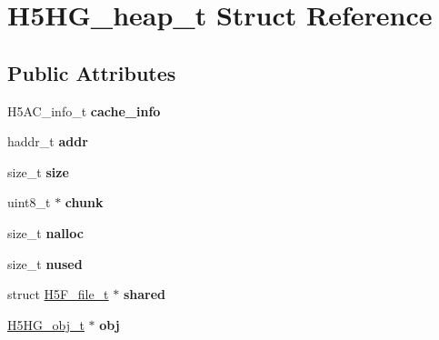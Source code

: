 \hypertarget{struct_h5_h_g__heap__t}{}\section{H5\+H\+G\+\_\+heap\+\_\+t Struct Reference}
\label{struct_h5_h_g__heap__t}
\subsection*{Public Attributes}
\begin{DoxyCompactItemize}
\item 
\mbox{\label{struct_h5_h_g__heap__t_a3ec432dd6bd4efb391eebd03de97f101}} 
H5\+A\+C\+\_\+info\+\_\+t {\bfseries cache\+\_\+info}
\item 
\mbox{\label{struct_h5_h_g__heap__t_a74bdbd9e61f10652630cbc2b3e11aa69}} 
haddr\+\_\+t {\bfseries addr}
\item 
\mbox{\label{struct_h5_h_g__heap__t_a4e41a81d045111e3e108b19acaa238b2}} 
size\+\_\+t {\bfseries size}
\item 
\mbox{\label{struct_h5_h_g__heap__t_a8fe0ba2289c6631b449b33b65012e7af}} 
uint8\+\_\+t $\ast$ {\bfseries chunk}
\item 
\mbox{\label{struct_h5_h_g__heap__t_ab0f58e1c6dda9368f793a255aaa9c767}} 
size\+\_\+t {\bfseries nalloc}
\item 
\mbox{\label{struct_h5_h_g__heap__t_a0dbcc3a473df5a5fcb4cf212ec3ccc25}} 
size\+\_\+t {\bfseries nused}
\item 
\mbox{\label{struct_h5_h_g__heap__t_afab93301474f8144d23f8877a1a0e421}} 
struct \hyperlink{struct_h5_f__file__t}{H5\+F\+\_\+file\+\_\+t} $\ast$ {\bfseries shared}
\item 
\mbox{\label{struct_h5_h_g__heap__t_a12d0836d84b23c0953ca73f53e2ec655}} 
\hyperlink{struct_h5_h_g__obj__t}{H5\+H\+G\+\_\+obj\+\_\+t} $\ast$ {\bfseries obj}
\end{DoxyCompactItemize}


